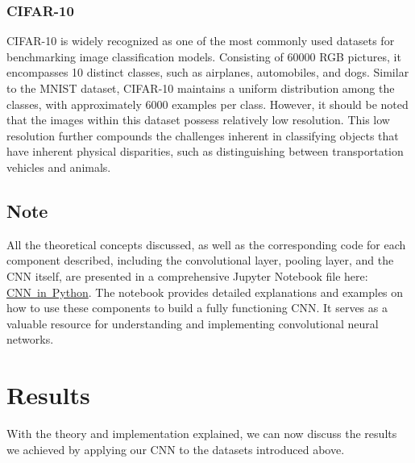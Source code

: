 \documentclass[onecolumn,10pt,cleanfoot]{asme2ej}
\begin{document}
\subsubsection{CIFAR-10}
CIFAR-10 is widely recognized as one of the most commonly used datasets for benchmarking image classification models. Consisting of $60000$ RGB pictures, it encompasses 10 distinct classes, such as airplanes, automobiles, and dogs. Similar to the MNIST dataset, CIFAR-10 maintains a uniform distribution among the classes, with approximately $6000$ examples per class. However, it should be noted that the images within this dataset possess relatively low resolution. This low resolution further compounds the challenges inherent in classifying objects that have inherent physical disparities, such as distinguishing between transportation vehicles and animals.

\subsection{Note}
All the theoretical concepts discussed, as well as the corresponding code for each component described, including the convolutional layer, pooling layer, and the CNN itself, are presented in a comprehensive Jupyter Notebook file here: \href{https://github.com/EricEReber/CNN/blob/main/doc/CNN_in_Python.ipynb}{\color{blue}CNN\ in\ Python}. The notebook provides detailed explanations and examples on how to use these components to build a fully functioning CNN. It serves as a valuable resource for understanding and implementing convolutional neural networks.

\section{Results}
With the theory and implementation explained, we can now discuss the results we achieved by applying our CNN to the datasets introduced above. 
\end{document}
